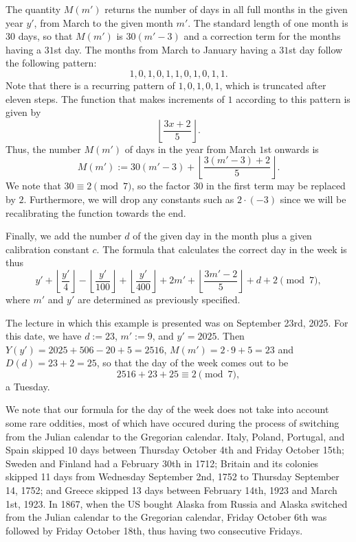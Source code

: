 \begin{example}
  The quantity $M(m')$ returns the number of days in all full months in the given year $y'$, from March to the given month $m'$. The standard length of one month is $30$ days, so that $M(m')$ is $30(m'-3)$ and a correction term for the months having a $31$st day. The months from March to January having a $31$st day follow the following pattern:
  \begin{equation*}
    1,0,1,0,1,1,0,1,0,1,1.
  \end{equation*}
  Note that there is a recurring pattern of $1,0,1,0,1$, which is truncated after eleven steps. The function that makes increments of $1$ according to this pattern is given by
  \begin{equation*}
    \left\lfloor\frac{3x+2}{5}\right\rfloor.
  \end{equation*}
  Thus, the number $M(m')$ of days in the year from March $1$st onwards is
  \begin{equation*}
    M(m'):= 30(m'-3) + \left\lfloor\frac{3(m'-3)+2}{5}\right\rfloor.
  \end{equation*}
  We note that $30\equiv 2\pmod 7$, so the factor $30$ in the first term may be replaced by $2$. Furthermore, we will drop any constants such as $2\cdot (-3)$ since we will be recalibrating the function towards the end.

  Finally, we add the number $d$ of the given day in the month plus a given calibration constant $c$. The formula that calculates the correct day in the week is thus
  \begin{equation*}
    y'+
    \left\lfloor\frac{y'}{4}\right\rfloor
    -\left\lfloor\frac{y'}{100}\right\rfloor
    +\left\lfloor\frac{y'}{400}\right\rfloor
    +2m'
    + \left\lfloor\frac{3m'-2}{5}\right\rfloor
    +d
    +2 \pmod{7},
  \end{equation*}
  where $m'$ and $y'$ are determined as previously specified.
  
  The lecture in which this example is presented was on September 23rd, 2025. For this date, we have $d:= 23$, $m':= 9$, and $y'=2025$. Then $Y(y')=2025+506-20+5=2516$, $M(m')=2\cdot 9+5=23$ and $D(d)=23+2=25$, so that the day of the week comes out to be
  \begin{equation*}
    2516+23+25 \equiv 2\pmod{7},
  \end{equation*}
  a Tuesday.

  We note that our formula for the day of the week does not take into account some rare oddities, most of which have occured during the process of switching from the Julian calendar to the Gregorian calendar. Italy, Poland, Portugal, and Spain skipped 10 days between Thursday October 4th and Friday October 15th; Sweden and Finland had a February 30th in 1712; Britain and its colonies skipped 11 days from Wednesday September 2nd, 1752 to Thursday September 14, 1752; and Greece skipped 13 days between February 14th, 1923 and March 1st, 1923. In 1867, when the US bought Alaska from Russia and Alaska switched from the Julian calendar to the Gregorian calendar, Friday October 6th was followed by Friday October 18th, thus having two consecutive Fridays.
\end{example}

